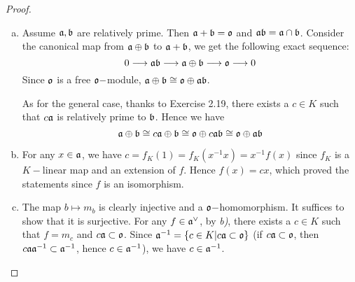   \begin{proof}
    \begin{enumerate}[a)]
      \item Assume $\aa,\bb$ are relatively prime. Then $\aa+\bb=\oo$ and $\aa\bb=\aa\cap\bb$.
               Consider the canonical map from $\aa\oplus\bb$ to $\aa+\bb$, we get the following exact sequence:
               \begin{equation*}
                 0 \To \aa\bb \To \aa\oplus\bb \To \oo \To 0
               \end{equation*}
               Since $\oo$ is a free $\oo-$module, $\aa\oplus\bb\cong\oo\oplus\aa\bb$.

               As for the general case, thanks to Exercise 2.19, there exists a $c\in K$ such that $c\aa$ is relatively prime to $\bb$. Hence we have
               \begin{equation*}
                 \aa\oplus\bb\cong c\aa\oplus\bb\cong\oo\oplus c\aa\bb\cong\oo\oplus\aa\bb
               \end{equation*}
      \item For any $x\in\aa$, we have $c=f_K(1)=f_K(x^{-1}x)=x^{-1}f(x)$ since $f_K$ is a $K-$linear map and an extension of $f$.
               Hence $f(x)=cx$, which proved the statements since $f$ is an isomorphism.
      \item The map $b\mapsto m_b$ is clearly injective and a $\oo-$homomorphism. It suffices to show that it is surjective.
               For any $f\in\codual{\aa}$, by \emph{b)}, there exists a $c\in K$ such that $f=m_c$ and $c\aa\subset\oo$. Since $\aa^{-1}=\{c\in K|c\aa\subset\oo\}$ (if $c\aa\subset\oo$, then $c\aa\aa^{-1}\subset\aa^{-1}$, hence $c\in\aa^{-1}$), we have $c\in\aa^{-1}$.
    \end{enumerate}
  \end{proof}

